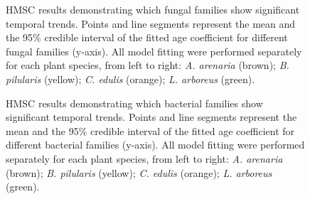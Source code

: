 \newpage
\begin{figure}
	\centering
	\caption[HMSC results demonstrating which fungal families show significant temporal trends.]
		{\hspace{1mm} HMSC results demonstrating which fungal families show significant temporal trends. Points and line segments represent the mean and the 95$\%$ credible interval of the fitted age coefficient for different fungal families (y-axis). All model fitting were performed separately for each plant species, from left to right: \textit{A. arenaria} (brown); \textit{B. pilularis} (yellow); \textit{C. edulis} (orange); \textit{L. arboreus} (green).}
	\label{fig:FunHMSC}
\end{figure}



\newpage
\begin{figure}
	\centering
	\caption[HMSC results demonstrating which bacterial families show significant temporal trends.]
		{\hspace{1mm} HMSC results demonstrating which bacterial families show significant temporal trends. Points and line segments represent the mean and the 95$\%$ credible interval of the fitted age coefficient for different bacterial families (y-axis). All model fitting were performed separately for each plant species, from left to right: \textit{A. arenaria} (brown); \textit{B. pilularis} (yellow); \textit{C. edulis} (orange); \textit{L. arboreus} (green).}
	\label{fig:BacHMSC}
\end{figure}



